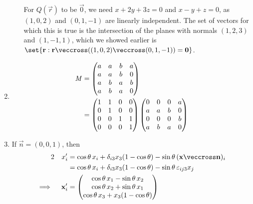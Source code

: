 \documentclass[fleqn,a4paper,11pt]{article}
\begin{document}
\begin{enumerate}[label=\textbf{\arabic*.}]
\begin{enumerate}[label=(\alph*)]
      For \(Q(\vec r)\) to be \(\vec 0\), we need \(x + 2y + 3z = 0\) and
      \(x - y + z = 0\), as \((1, 0, 2)\) and \((0, 1, -1)\) are linearly
      independent. The set of vectors for which this is true is the intersection
      of the planes with normals \((1, 2, 3)\) and \((1, -1, 1)\), which we
      showed earlier is
      \(\set{\vec r : \vec r \veccross
                      ((1, 0, 2) \veccross (0, 1, -1)) = \vec 0}\).
    \end{enumerate}
   \item
    \begin{align*}
     \mathit{M}
      &=
      \begin{pmatrix}
       a & a & b & a \\
       a & a & b & 0 \\
       a & b & a & b \\
       a & b & a & 0
      \end{pmatrix} \\
      &=
      \begin{pmatrix}
       1 & 1 & 0 & 0 \\
       0 & 1 & 0 & 0 \\
       0 & 0 & 1 & 1 \\
       0 & 0 & 0 & 1
      \end{pmatrix}
      \begin{pmatrix}
       0 & 0 & 0 & a \\
       a & a & b & 0 \\
       0 & 0 & 0 & b \\
       a & b & a & 0
      \end{pmatrix}
    \end{align*}
   \item
    If \(\vec n = (0, 0, 1)\), then
    \begin{alignat*}2
     && x_i' &= \cos \theta\,x_i + \delta_{i3} x_3(1 - \cos \theta) -
                \sin \theta\,(\vec x \veccross \vec n)_i \\
     &&      &= \cos \theta\,x_i + \delta_{i3} x_3(1 - \cos \theta) -
                \sin \theta\,\epsilon_{ij3}x_j \\
     \implies{}&& \vec x_i'
      &=
      \begin{pmatrix}
       \cos\theta\,x_1 - \sin\theta\,x_2 \\
       \cos\theta\,x_2 + \sin\theta\,x_1 \\
       \cos\theta\,x_3 + x_3(1 - \cos\theta)
      \end{pmatrix} \\

\end{alignat*}
\end{enumerate}
\end{document}

